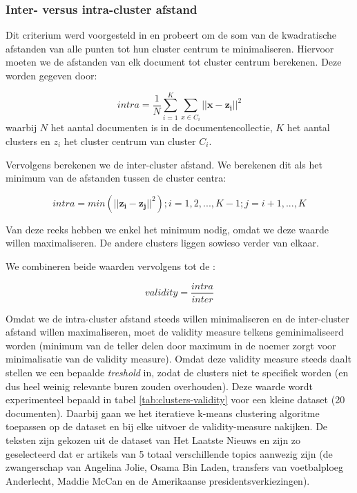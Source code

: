 \subsubsection{Inter- versus intra-cluster afstand}
Dit criterium werd voorgesteld in \cite{Ray} en probeert om de som van de kwadratische afstanden van alle punten tot hun cluster centrum te minimaliseren. Hiervoor moeten we de afstanden van elk document tot cluster centrum berekenen. Deze worden gegeven door:

\begin{equation}
intra = \frac{1}{N}\sum_{i=1}^{K}\sum_{x\in{C_i}}^{} \vert\vert \mathbf{x-z_i} \vert\vert ^2 
\end{equation}
waarbij $N$ het aantal documenten is in de documentencollectie, $K$ het aantal clusters en $z_i$ het cluster centrum van cluster $C_i$.

Vervolgens berekenen we de inter-cluster afstand. We berekenen dit als het minimum van de afstanden tussen de cluster centra:

\begin{equation}
intra = min(\vert\vert \mathbf{z_i-z_j}\vert\vert^2) ; i = 1,2,...,K-1 ; j = i+1, ..., K
\end{equation}

Van deze reeks hebben we enkel het minimum nodig, omdat we deze waarde willen maximaliseren. De andere clusters liggen sowieso verder van elkaar.

We combineren beide waarden vervolgens tot de :

\begin{equation}
validity = \frac{intra}{inter}
\end{equation}

Omdat we de intra-cluster afstand steeds willen minimaliseren en de inter-cluster afstand willen maximaliseren, moet de validity measure telkens geminimaliseerd worden (minimum van de teller delen door maximum in de noemer zorgt voor minimalisatie van de validity measure). Omdat deze validity measure steeds daalt stellen we een bepaalde \textit{treshold} in, zodat de clusters niet te specifiek worden (en dus heel weinig relevante buren zouden overhouden). Deze waarde wordt experimenteel bepaald in tabel \ref{tab:clusters-validity} voor een kleine dataset (20 documenten). Daarbij gaan we het iteratieve k-means clustering algoritme toepassen op de dataset en bij elke uitvoer de validity-measure nakijken. De teksten zijn gekozen uit de dataset van Het Laatste Nieuws en zijn zo geselecteerd dat er artikels van 5 totaal verschillende topics aanwezig zijn (de zwangerschap van Angelina Jolie, Osama Bin Laden, transfers van voetbalploeg Anderlecht, Maddie McCan en de Amerikaanse presidentsverkiezingen).


